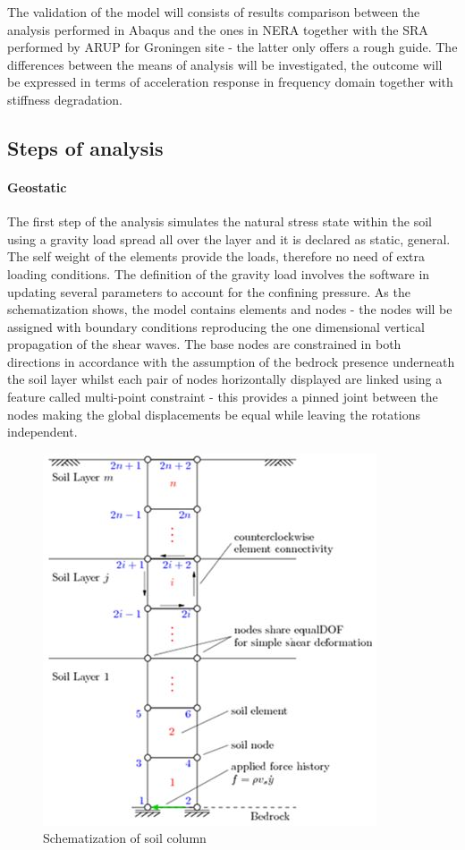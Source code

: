 	The validation of the model will consists of results comparison between the analysis performed in Abaqus and the ones in NERA together with the SRA performed by ARUP for Groningen site - the latter only offers a rough guide. The differences between the means of analysis will be investigated, the outcome will be expressed in terms of acceleration response in frequency domain together with stiffness degradation. 
	
	\subsection{Steps of analysis}
	\paragraph{Geostatic} The first step of the analysis simulates the natural stress state within the soil using a gravity load spread all over the layer and it is declared as static, general. The self weight of the elements provide the loads, therefore no need of extra loading conditions. The definition of the gravity load involves the software in updating several parameters to account for the confining pressure. As the schematization shows, the model contains elements and nodes - the nodes will be assigned with boundary conditions reproducing the one dimensional vertical propagation of the shear waves. The base nodes are constrained in both directions in accordance with the assumption of the bedrock presence underneath the soil layer whilst each pair of nodes horizontally displayed are linked using a feature called multi-point constraint - this provides a pinned joint between the nodes making the global displacements be equal while leaving the rotations independent. 
	
	\begin{figure}
		\centering
		\includegraphics[width=0.5\linewidth]{"Soil column"}
		\caption[]{Schematization of soil column}
		\label{Soilcolumn}
	\end{figure}
	

